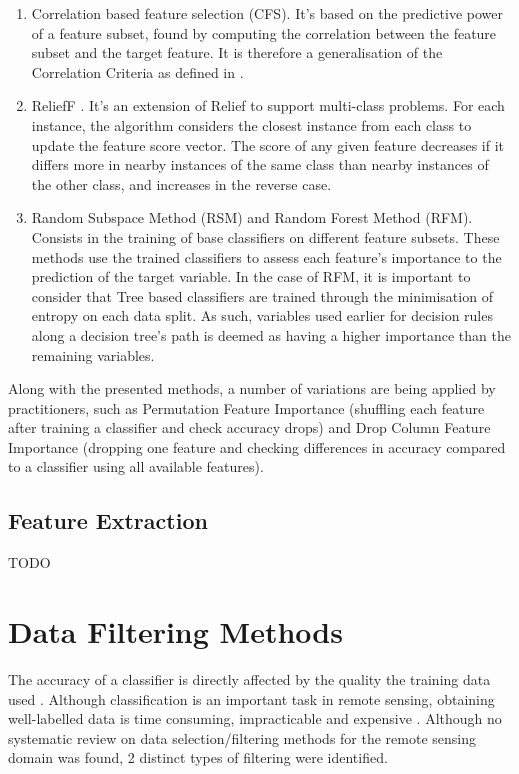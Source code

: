 \documentclass[12pt, english, openany]{book}
\begin{document}
\begin{enumerate}
  \item Correlation based feature selection (CFS). It's based on the predictive
  power of a feature subset, found by computing the correlation between the
  feature subset and the target feature. It is therefore a generalisation
  of the Correlation Criteria as defined in \cite{Ghojogh2019}.
  \item ReliefF \cite{kononenko1997}. It's an extension of Relief
  \cite{kira1992} to support multi-class problems. For each instance, the
  algorithm considers the closest instance from each class to update the
  feature score vector. The score of any given feature decreases if it differs
  more in nearby instances of the same class than nearby instances of the other
  class, and increases in the reverse case.
  \item Random Subspace Method (RSM) and Random Forest Method (RFM). Consists
  in the training of base classifiers on different feature subsets. These
  methods use the trained classifiers to assess each feature's importance to
  the prediction of the target variable. In the case of RFM, it is important to
  consider that Tree based classifiers are trained through the minimisation of
  entropy on each data split. As such, variables used earlier for decision
  rules along a decision tree's path is deemed as having a higher importance
  than the remaining variables.
\end{enumerate}

Along with the presented methods, a number of variations are being applied by
practitioners, such as Permutation Feature Importance (shuffling each feature
after training a classifier and check accuracy drops) and Drop Column Feature
Importance (dropping one feature and checking differences in accuracy compared
to a classifier using all available features).


\subsection*{Feature Extraction}
TODO


\section{Data Filtering Methods}

The accuracy of a classifier is directly affected by the quality the training
data used \cite{Boukir2019}. Although classification is an important task in
remote sensing, obtaining well-labelled data is time consuming, impracticable
and expensive \cite{Pelletier2017Filtering}. Although no systematic review on
data selection/filtering methods for the remote sensing domain was found, 2
distinct types of filtering were identified.
\end{document}
